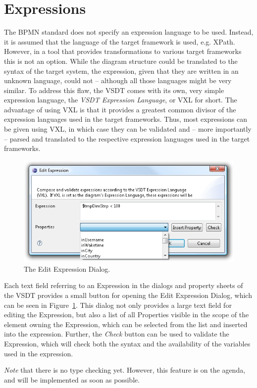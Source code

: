 \section{Expressions}
\label{sec:user_features_exp}

The BPMN standard does not specify an expression language to be used. Instead, it is assumed that
the language of the target framework is used, e.g. XPath. However, in a tool that provides
transformations to various target frameworks this is not an option. While the diagram structure
could be translated to the syntax of the target system, the expression, given that they are written
in an unknown language, could not -- although all those languages might be very similar. To address
this flaw, the VSDT comes with its own, very simple expression language, the \emph{VSDT Expression
Language}, or VXL for short. The advantage of using VXL is that it provides a greatest common
divisor of the expression languages used in the target frameworks. Thus, most expressions can be
given using VXL, in which case they can be validated and -- more importantly -- parsed and
translated to the respective expression languages used in the target frameworks.

\begin{figure}[ht]
	\centering
	\includegraphics[width=.5\textwidth]{figures/features/editExp.png}
	\caption{The Edit Expression Dialog.}
	\label{fig:editExp}
\end{figure}

Each text field referring to an Expression in the dialogs and property sheets of the VSDT provides a
small button for opening the Edit Expression Dialog, which can be seen in Figure~\ref{fig:editExp}.
This dialog not only provides a large text field for editing the Expression, but also a list of all
Properties visible in the scope of the element owning the Expression, which can be selected from the
list and inserted into the expression. Further, the \emph{Check} button can be used to validate the
Expression, which will check both the syntax and the availability of the variables used in the
expression.

\emph{Note} that there is no type checking yet. However, this feature is on the agenda, and will be
implemented as soon as possible.

